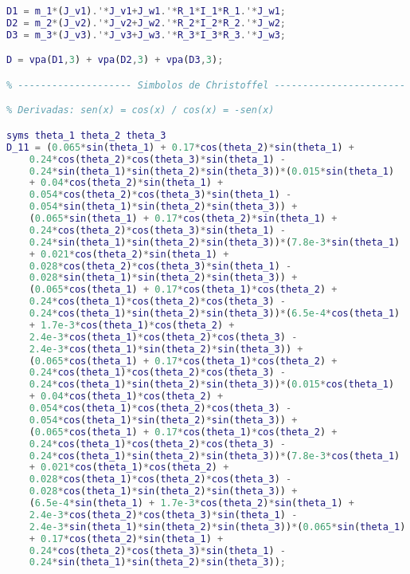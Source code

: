 \begin{anexosenv}
\begin{lstlisting}[language=Matlab]
D1 = m_1*(J_v1).'*J_v1+J_w1.'*R_1*I_1*R_1.'*J_w1;
D2 = m_2*(J_v2).'*J_v2+J_w2.'*R_2*I_2*R_2.'*J_w2;
D3 = m_3*(J_v3).'*J_v3+J_w3.'*R_3*I_3*R_3.'*J_w3;

D = vpa(D1,3) + vpa(D2,3) + vpa(D3,3);

% -------------------- Simbolos de Christoffel -----------------------

% Derivadas: sen(x) = cos(x) / cos(x) = -sen(x)

syms theta_1 theta_2 theta_3
D_11 = (0.065*sin(theta_1) + 0.17*cos(theta_2)*sin(theta_1) + 
    0.24*cos(theta_2)*cos(theta_3)*sin(theta_1) - 
    0.24*sin(theta_1)*sin(theta_2)*sin(theta_3))*(0.015*sin(theta_1)
    + 0.04*cos(theta_2)*sin(theta_1) +
    0.054*cos(theta_2)*cos(theta_3)*sin(theta_1) - 
    0.054*sin(theta_1)*sin(theta_2)*sin(theta_3)) +
    (0.065*sin(theta_1) + 0.17*cos(theta_2)*sin(theta_1) +
    0.24*cos(theta_2)*cos(theta_3)*sin(theta_1) - 
    0.24*sin(theta_1)*sin(theta_2)*sin(theta_3))*(7.8e-3*sin(theta_1)
    + 0.021*cos(theta_2)*sin(theta_1) +
    0.028*cos(theta_2)*cos(theta_3)*sin(theta_1) - 
    0.028*sin(theta_1)*sin(theta_2)*sin(theta_3)) +
    (0.065*cos(theta_1) + 0.17*cos(theta_1)*cos(theta_2) +
    0.24*cos(theta_1)*cos(theta_2)*cos(theta_3) - 
    0.24*cos(theta_1)*sin(theta_2)*sin(theta_3))*(6.5e-4*cos(theta_1)
    + 1.7e-3*cos(theta_1)*cos(theta_2) +
    2.4e-3*cos(theta_1)*cos(theta_2)*cos(theta_3) - 
    2.4e-3*cos(theta_1)*sin(theta_2)*sin(theta_3)) +
    (0.065*cos(theta_1) + 0.17*cos(theta_1)*cos(theta_2) +
    0.24*cos(theta_1)*cos(theta_2)*cos(theta_3) - 
    0.24*cos(theta_1)*sin(theta_2)*sin(theta_3))*(0.015*cos(theta_1)
    + 0.04*cos(theta_1)*cos(theta_2) +
    0.054*cos(theta_1)*cos(theta_2)*cos(theta_3) - 
    0.054*cos(theta_1)*sin(theta_2)*sin(theta_3)) +
    (0.065*cos(theta_1) + 0.17*cos(theta_1)*cos(theta_2) +
    0.24*cos(theta_1)*cos(theta_2)*cos(theta_3) - 
    0.24*cos(theta_1)*sin(theta_2)*sin(theta_3))*(7.8e-3*cos(theta_1)
    + 0.021*cos(theta_1)*cos(theta_2) +
    0.028*cos(theta_1)*cos(theta_2)*cos(theta_3) - 
    0.028*cos(theta_1)*sin(theta_2)*sin(theta_3)) +
    (6.5e-4*sin(theta_1) + 1.7e-3*cos(theta_2)*sin(theta_1) +
    2.4e-3*cos(theta_2)*cos(theta_3)*sin(theta_1) - 
    2.4e-3*sin(theta_1)*sin(theta_2)*sin(theta_3))*(0.065*sin(theta_1)
    + 0.17*cos(theta_2)*sin(theta_1) +
    0.24*cos(theta_2)*cos(theta_3)*sin(theta_1) - 
    0.24*sin(theta_1)*sin(theta_2)*sin(theta_3));


\end{lstlisting}
\end{anexosenv}
